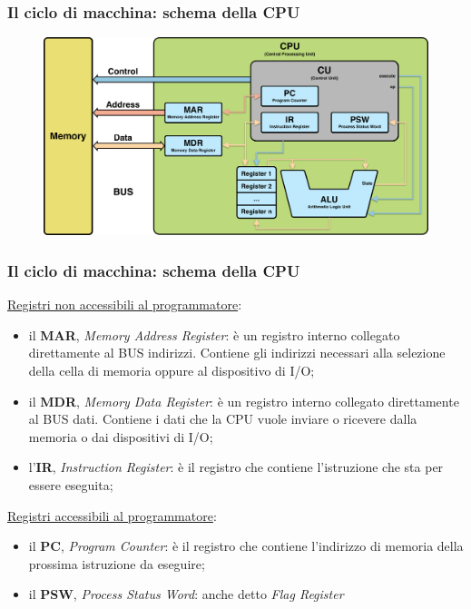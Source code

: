 \begin{frame}
	\frametitle{Il ciclo di macchina: schema della CPU} %
	
	\begin{figure}[!htbp] 
		\centering
		\includegraphics[width=1.0\linewidth]{images/4_cpu/architecture_cpu_complex.pdf}
		\label{fig:cpu_complex}
	\end{figure}
	 
\end{frame}


\begin{frame}
	\frametitle{Il ciclo di macchina: schema della CPU}
	
	\underline{Registri non accessibili al programmatore}:
	\begin{itemize}
		\item il \textbf{MAR}, \textit{Memory Address Register}: è un registro interno collegato direttamente al BUS indirizzi. Contiene gli indirizzi necessari alla selezione della cella di memoria oppure al dispositivo di I/O;
		\item il \textbf{MDR}, \textit{Memory Data Register}: è un registro interno collegato direttamente al BUS dati. Contiene i dati che la CPU vuole inviare o ricevere dalla memoria o dai dispositivi di I/O;%
		\item l'\textbf{IR}, \textit{Instruction Register}: è il registro che contiene l'istruzione che sta per essere eseguita;
	\end{itemize}
	
	\underline{Registri accessibili al programmatore}:
	\begin{itemize}
		\item il \textbf{PC}, \textit{Program Counter}: è il registro che contiene l'indirizzo di memoria della prossima istruzione da eseguire;
		\item il \textbf{PSW}, \textit{Process Status Word}: anche detto \textit{Flag Register}
	\end{itemize}
	 
\end{frame}


